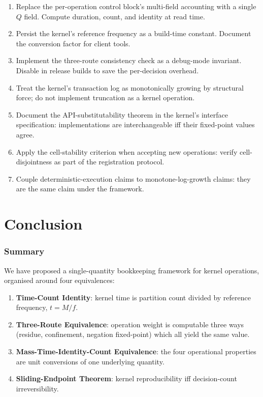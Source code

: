 \documentclass[twocolumn,11pt,a4paper]{article}
\newcommand{\Mcount}{M}
\newcommand{\Qweight}{Q}
\begin{document}
\begin{enumerate}[nosep,leftmargin=*]
\item Replace the per-operation control block's multi-field accounting with a single $\Qweight$ field. Compute duration, count, and identity at read time.
\item Persist the kernel's reference frequency as a build-time constant. Document the conversion factor for client tools.
\item Implement the three-route consistency check as a debug-mode invariant. Disable in release builds to save the per-decision overhead.
\item Treat the kernel's transaction log as monotonically growing by structural force; do not implement truncation as a kernel operation.
\item Document the API-substitutability theorem in the kernel's interface specification: implementations are interchangeable iff their fixed-point values agree.
\item Apply the cell-stability criterion when accepting new operations: verify cell-disjointness as part of the registration protocol.
\item Couple deterministic-execution claims to monotone-log-growth claims: they are the same claim under the framework.
\end{enumerate}

\part{Conclusion}

\section{Summary}

We have proposed a single-quantity bookkeeping framework for kernel operations, organised around four equivalences:

\begin{enumerate}[nosep,leftmargin=*]
\item \textbf{Time-Count Identity}: kernel time is partition count divided by reference frequency, $t = \Mcount/f$.
\item \textbf{Three-Route Equivalence}: operation weight is computable three ways (residue, confinement, negation fixed-point) which all yield the same value.
\item \textbf{Mass-Time-Identity-Count Equivalence}: the four operational properties are unit conversions of one underlying quantity.
\item \textbf{Sliding-Endpoint Theorem}: kernel reproducibility iff decision-count irreversibility.
\end{enumerate}
\end{document}
